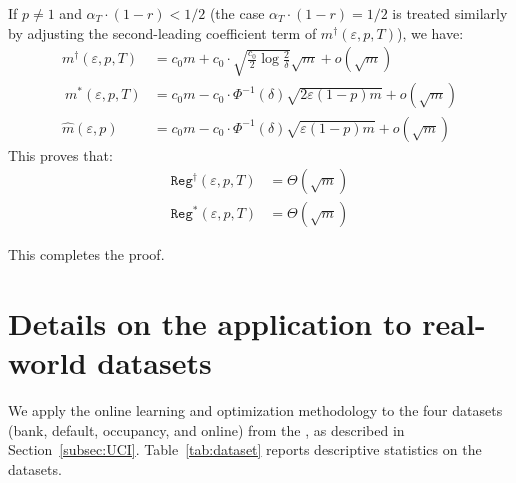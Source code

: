 \documentclass[blindrev]{informs3noheader}
\begin{document}
If $p\neq1$ and $\alpha_T\cdot(1-r)<1/2$ (the case $\alpha_T\cdot(1-r)=1/2$ is treated similarly by adjusting the second-leading coefficient term of $m^\dagger(\varepsilon,p,T)$), we have:
\begin{align*}
m^\dagger(\varepsilon,p,T)&=c_0m+c_0\cdot\sqrt{\frac{c_0}{2}\log \frac{2}{\delta}}\sqrt{m} +  o\left(\sqrt{m}\right)\\\
m^*(\varepsilon,p,T)&=c_0m-c_0\cdot\Phi^{-1}(\delta)\sqrt{2\varepsilon(1-p)m} +  o\left(\sqrt{m}\right)\\
\widehat{m}(\varepsilon,p)&=c_0m-c_0\cdot\Phi^{-1}(\delta)\sqrt{\varepsilon(1-p)m}+o(\sqrt m)
\end{align*}
This proves that:
\begin{align*}
\texttt{Reg}^\dagger(\varepsilon, p,T)&=
    \Theta(\sqrt m)\\
\texttt{Reg}^*(\varepsilon, p,T)&=
    \Theta(\sqrt m)
\end{align*}

This completes the proof.\hfill\Halmos

\section{Details on the application to real-world datasets}
\label{app:UCI}

We apply the online learning and optimization methodology to the four datasets (bank, default, occupancy, and online) from the \cite{UCI}, as described in Section~\ref{subsec:UCI}. Table~\ref{tab:dataset} reports descriptive statistics on the datasets.
\end{document}
